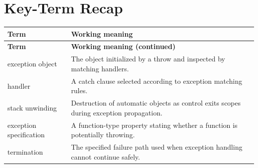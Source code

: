 \documentclass[11pt,letterpaper]{article}
\begin{document}
\section{Key-Term Recap}
\begin{longtable}{@{}>{\RaggedRight\arraybackslash}p{}>{\RaggedRight\arraybackslash}p{}@{}}\toprule\textbf{Term} & \textbf{Working meaning}\\\midrule\endfirsthead\toprule\textbf{Term} & \textbf{Working meaning (continued)}\\\midrule\endhead\bottomrule\endfoot
exception object & The object initialized by a throw and inspected by matching handlers.\\
handler & A catch clause selected according to exception matching rules.\\
stack unwinding & Destruction of automatic objects as control exits scopes during exception propagation.\\
exception specification & A function-type property stating whether a function is potentially throwing.\\
termination & The specified failure path used when exception handling cannot continue safely.\\
\end{longtable}
\end{document}

